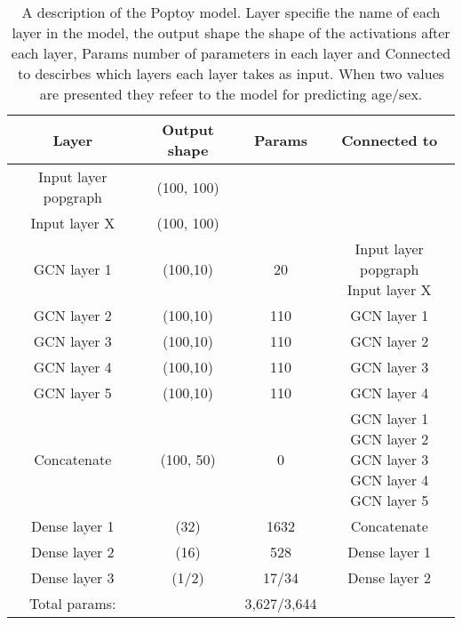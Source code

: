 \begin{table}[H]
    \centering
    \caption{A description of the Poptoy model. Layer specifie the name of each layer in the model, the output shape the shape of the activations after each layer, Params number of parameters in each layer and Connected to descirbes which layers each layer takes as input. When two values are presented they refeer to the model for predicting age/sex. }
    \begin{tabular}{c|c c c}
         Layer & Output shape & Params & Connected to\\ \hline\hline
         Input layer popgraph &(100, 100) & & \\ \hline
         Input layer X &  (100, 100)& & \\ \hline
         GCN layer 1 & (100,10) & 20 & \thead{Input layer popgraph \\ Input layer X}   \\ \hline
         GCN layer 2 & (100,10)& 110 & GCN layer 1\\ \hline
         GCN layer 3 & (100,10)& 110  &GCN layer 2\\ \hline
         GCN layer 4 & (100,10)& 110  &GCN layer 3\\ \hline
         GCN layer 5 & (100,10)& 110  &GCN layer 4\\ \hline
         Concatenate & (100, 50)  & 0 & \thead{GCN layer 1\\GCN layer 2\\GCN layer 3\\GCN layer 4\\GCN layer 5} \\ \hline
         Dense layer 1& (32) & 1632 & Concatenate \\
         Dense layer 2& (16) & 528 & Dense layer 1\\
         Dense layer 3& (1/2) & 17/34 & Dense layer 2\\
         \hline\hline
         Total params:& & 3,627/3,644
    \end{tabular}
    \label{tab:Models_Poptoy}
\end{table}

